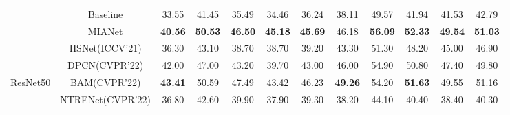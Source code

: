 \documentclass[10pt,twocolumn,letterpaper]{article}
\begin{document}
\begin{table*}[htbp]
\begin{tabular}{c|c|ccccc|ccccc}
		& Baseline                     & 33.55                                  & 41.45                                  & 35.49                                  & 34.46                                  & 36.24                                  & 38.11                         & 49.57                                  & 41.94                                  & 41.53                                  & 42.79                         \\
		& \cellcolor[HTML]{EFEFEF}MIANet & \cellcolor[HTML]{EFEFEF}\textbf{40.56} & \cellcolor[HTML]{EFEFEF}\textbf{50.53} & \cellcolor[HTML]{EFEFEF}\textbf{46.50} & \cellcolor[HTML]{EFEFEF}\textbf{45.18} & \cellcolor[HTML]{EFEFEF}\textbf{45.69} & \cellcolor[HTML]{EFEFEF}\underline{46.18} & \cellcolor[HTML]{EFEFEF}\textbf{56.09} & \cellcolor[HTML]{EFEFEF}\textbf{52.33} & \cellcolor[HTML]{EFEFEF}\textbf{49.54} & \cellcolor[HTML]{EFEFEF}\textbf{51.03} \\ \hline \hline
		& \multicolumn{1}{c|}{HSNet(ICCV'21)\cite{hsnet}}                       & 36.30                                  & 43.10                                  & 38.70                                  & 38.70                                  & \multicolumn{1}{c|}{39.20}                                  & 43.30                         & 51.30                                  & 48.20                         & 45.00                                  & 46.90                         \\
		& DPCN(CVPR'22)\cite{dpcn}                         & 42.00                                  & 47.00                                  & 43.20                                  & 39.70                                  & 43.00                                  & 46.00                         & 54.90                                  & 50.80                                  & 47.40                                  & 49.80                         \\
		ResNet50                   & BAM(CVPR'22)\cite{bam}                          & \textbf{43.41}                         & \underline{50.59}                                 & \underline{47.49}                                  & \underline{43.42}                                  & \underline{46.23}                                  & \textbf{49.26}                & \underline{54.20}                                  & \textbf{51.63}                         & \underline{49.55}                         & \underline{51.16}                \\
		& NTRENet(CVPR'22)\cite{ntre}                      & 36.80                                  & 42.60                                  & 39.90                                  & 37.90                                  & 39.30                                  & 38.20                         & 44.10                                  & 40.40                                  & 38.40                                  & 40.30                         \\

\end{tabular}
\end{table*}
\end{document}

